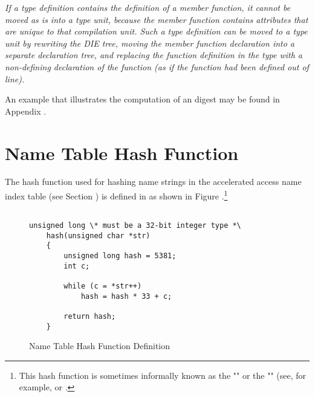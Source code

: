 \textit{If a type definition contains the definition of a member function, 
it cannot be moved as is into a type unit, because the member function 
contains attributes that are unique to that compilation unit. 
Such a type definition can be moved to a type unit by rewriting the DIE tree, 
moving the member function declaration into a separate declaration tree, 
and replacing the function definition in the type with a non-defining 
declaration of the function (as if the function had been defined out of 
line).}

An example that illustrates the computation of an \MDfive{} digest may be found in 
Appendix .

\section{Name Table Hash Function}
\label{datarep:nametablehashfunction}
The hash function used for hashing name strings in the accelerated 
access name index table (see Section )
is defined in  as shown in 
Figure .\footnote{
This hash function is sometimes informally known as the 
"" or the ""
(see, for example, 
 or
.} 

\begin{figure}[h]
\begin{lstlisting}

unsigned long \* must be a 32-bit integer type *\
    hash(unsigned char *str)
    {
        unsigned long hash = 5381;
        int c;

        while (c = *str++)
            hash = hash * 33 + c;

        return hash;
    }

\end{lstlisting}
\caption{Name Table Hash Function Definition}
\label{fig:nametablehashfunctiondefinition}
\end{figure}

